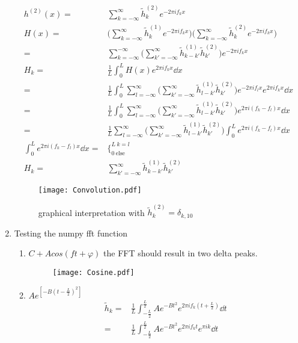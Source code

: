 \documentclass{article}
\begin{document}
\begin{enumerate}
\begin{align}
		h^{(2)}(x) =& \sum_{k=-\infty}^{\infty} \tilde h_k^{(2)} e^{-2 \pi i f_k x} \\
		H(x)=& \bigg( \sum_{k=-\infty}^{\infty} \tilde h_k^{(1)} e^{-2 \pi i f_k x} \bigg) \bigg( \sum_{k=-\infty}^{\infty} \tilde h_k^{(2)} e^{-2 \pi i f_k x} \bigg) \\
		=& \sum_{k=-\infty}^{-\infty} \bigg( \sum_{k'=-\infty}^{\infty} \tilde h_{k-k'}^{(1)} \tilde h_{k'}^{(2)} \bigg) e^{-2 \pi i f_k x} \\
		H_k =& \frac{1}{L} \int_0^L H(x) e^{2 \pi i f_k x} \dd{x} \\
		=& \frac{1}{L} \int_0^L \sum_{l=-\infty}^{\infty} \bigg( \sum_{k'=-\infty}^{\infty} \tilde h_{l-k'}^{(1)} \tilde h_{k'}^{(2)} \bigg) e^{-2 \pi i f_l x} e^{2 \pi i f_k x} \dd{x} \\
		=& \frac{1}{L} \int_0^L \sum_{l=-\infty}^{\infty} \bigg( \sum_{k'=-\infty}^{\infty} \tilde h_{l-k'}^{(1)} \tilde h_{k'}^{(2)} \bigg) e^{2 \pi i (f_k - f_l) x} \dd{x} \\
		=& \frac{1}{L} \sum_{l=-\infty}^{\infty} \bigg( \sum_{k'=-\infty}^{\infty} \tilde h_{l-k'}^{(1)} \tilde h_{k'}^{(2)} \bigg) \int_0^L e^{2 \pi i (f_k - f_l) x} \dd{x} \\
		\int_0^L e^{2 \pi i (f_k - f_l) x} \dd{x} =& \big\{_{0 \ \text{else}}^{L \ k=l} \\
		H_k =& \sum_{k'=-\infty}^{\infty} \tilde h_{k-k'}^{(1)} \tilde h_{k'}^{(2)}
	\end{align}
	\begin{figure}[h]
	\texttt{[image: Convolution.pdf]}
	\caption{graphical interpretation with \(\tilde h_k^{(2)} = \delta_{k,10}\)}
	\end{figure}
	\item Testing the numpy fft function
		\begin{enumerate}
			\item \(C + Acos(ft + \varphi)\) the FFT should result in two delta peaks. 
			\begin{figure}[ht]
			\texttt{[image: Cosine.pdf]}
			\end{figure}
			\item \(A e^{[-B(t-\frac{L}{2})^2]}\)
			\begin{align}
				\tilde h_k =& \frac{1}{L} \int_{-\frac{L}{2}}^{\frac{L}{2}} A e^{-Bt^2} e^{2 \pi i f_k (t + \frac{L}{2})} \dd{t} \\
				=& \frac{1}{L} \int_{-\frac{L}{2}}^{\frac{L}{2}} A e^{-Bt^2} e^{2 \pi i f_k t} e^{\pi i k}\dd{t} \\

\end{align}
\end{enumerate}
\end{enumerate}
\end{document}
